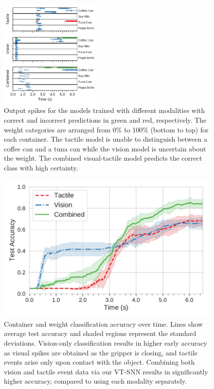 \documentclass[fyp]{socreport}
\begin{document}
\begin{figure}
\centering
\includegraphics[width=0.45\textwidth]{images/analysis/spike_class_output.pdf}
\caption{Output spikes for the models trained with different modalities with
  correct and incorrect predictions in green and red, respectively. The weight
  categories are arranged from 0\% to 100\% (bottom to top) for each container.
  The tactile model is unable to distinguish between a coffee can and a tuna can
  while the vision model is uncertain about the weight. The combined
  visual-tactile model predicts the correct class with high certainty.\label{fig:spikeclass}}
\end{figure}

\begin{figure}
  \centering
  \includegraphics[width=0.45\columnwidth]{images/analysis/object_det_over_time.pdf}
  \caption{Container and weight classification accuracy over time. Lines show
    average test accuracy and shaded regions represent the standard deviations.
    Vision-only classification results in higher early accuracy as visual spikes
    are obtained as the gripper is closing, and tactile events arise only upon
    contact with the object. Combining both vision and tactile event data via
    our VT-SNN results in significantly higher accuracy, compared to using each
    modality separately.\label{fig:classtime}}
\end{figure}
\end{document}
